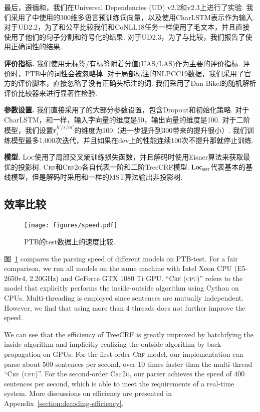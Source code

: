 最后，遵循\cite{ji-etal-2019-graph}和\cite{zhang-etal-2019-empirical}，我们在Universal Dependencies (UD) v2.2和v2.3上进行了实验.
我们采用了\cite{zeman-etal-2018-conll}中使用的300维多语言预训练词向量，以及使用CharLSTM表示作为输入.
对于UD2.2，为了和\cite{ji-etal-2019-graph}公平比较我们和CoNLL18任务一样\cite{zeman-etal-2018-conll}使用了毛文本，并且直接使用了他们的句子分割和符号化的结果.
对于UD2.3，为了与\cite{zhang-etal-2019-empirical}比较，我们报告了使用正确词性的结果.

\noindent\textbf{评价指标.}
我们使用无标签/有标签附着分值(UAS/LAS)作为主要的评价指标.
评价时，PTB中的词性会被忽略掉.
对于局部标注的NLPCC19数据，我们采用了官方的评价脚本，直接忽略了没有正确头标注的词.
我们采用了Dan Bikel的随机解析评价比较器来进行显著性检验.

\noindent\textbf{参数设置.}
我们直接采用了\cite{Timothy-d17-biaffine}的大部分参数设置，包含Dropout和初始化策略.
对于CharLSTM，和\cite{lample-etal-2016-neural}一样，输入字向量的维度是50，输出向量的维度是100.
对于二阶模型，我们设置$\mathbf{r}^{h'/s/m'}_i$的维度为100（进一步提升到300带来的提升很小）.
我们训练模型最多1,000次迭代，并且如果在dev上的性能连续100次不提升那就停止训练.

\noindent\textbf{模型.}
\textsc{Loc}使用了局部交叉熵训练损失函数，并且解码时使用Eisner算法来获取最优的投影树.
\textsc{Crf}和\textsc{Crf2o}各自代表一阶和二阶TreeCRF模型.
$\textsc{Loc}_{\textsc{mst}}$代表基本的基线模型，但是解码时采用和\cite{Timothy-d17-biaffine}一样的MST算法输出非投影树.

\subsection{效率比较}

\begin{figure}[tb]
    \centering
    \texttt{[image: figures/speed.pdf]}
    \caption{
        PTB的test数据上的速度比较.
    }
    \label{fig:speed}
\end{figure}

图~\ref{fig:speed} compares the parsing speed of different models on PTB-test.
For a fair comparison, we run all models on the same machine with Intel Xeon CPU (E5-2650v4, 2.20GHz) and GeForce GTX 1080 Ti GPU.
``\textsc{Crf (cpu)}'' refers to the model that explicitly
performs the inside-outside algorithm using Cython on CPUs.
Multi-threading is employed since sentences are mutually independent.
However, we find that using more than 4 threads does not further improve the speed.

We can see that the efficiency of TreeCRF is greatly improved by batchifying the inside algorithm and implicitly
realizing the outside algorithm by back-propagation on GPUs.
For the first-order \textsc{Crf} model,
our implementation can parse about 500 sentences per second, over 10 times faster than the multi-thread ``\textsc{Crf (cpu)}''.
For the second-order \textsc{Crf2o}, our parser achieves the speed of 400 sentences per second, which is able to meet the requirements of a real-time system.
More discussions on efficiency are presented in Appendix~\ref{section:decoding-efficiency}.

